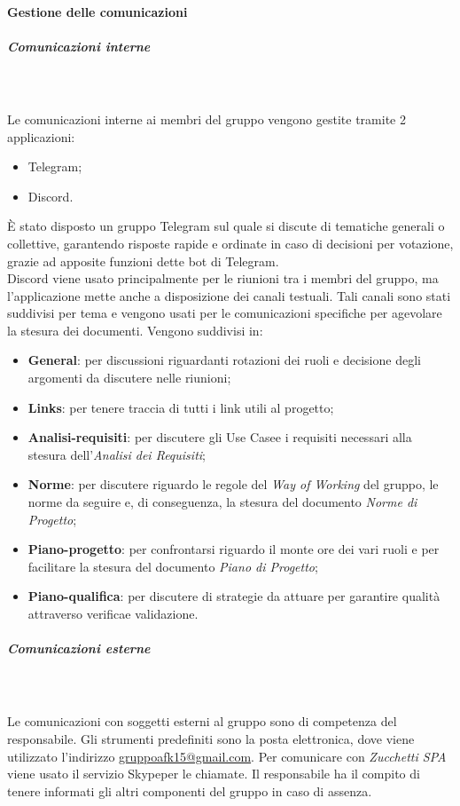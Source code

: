 \paragraph{Gestione delle comunicazioni}
\subparagraph{Comunicazioni interne}\mbox{} \\ \mbox{} \\
Le comunicazioni interne ai membri del gruppo vengono gestite  tramite 2 applicazioni:
\begin{itemize}
	\item Telegram\glo;
	\item Discord\glo.
\end{itemize}
È stato disposto un gruppo Telegram sul quale si discute di tematiche generali o collettive, garantendo risposte rapide e ordinate in caso di decisioni per votazione, grazie ad apposite funzioni dette bot di Telegram\glo. \\
Discord viene usato principalmente per le riunioni tra i membri del gruppo, ma l'applicazione mette anche a disposizione dei canali testuali. Tali canali sono stati suddivisi per tema e vengono usati per le comunicazioni specifiche per agevolare la stesura dei documenti. Vengono suddivisi in:
\begin{itemize}
	\item \textbf{General}: per discussioni riguardanti rotazioni dei ruoli e decisione degli argomenti da discutere nelle riunioni;
	\item \textbf{Links}: per tenere traccia di tutti i link utili al progetto;
	\item \textbf{Analisi-requisiti}: per discutere gli Use Case\glo e i requisiti necessari alla stesura dell'\textit{Analisi dei Requisiti};
	\item \textbf{Norme}: per discutere riguardo le regole del \textit{Way of Working} del gruppo, le norme da seguire e, di conseguenza, la stesura del documento \textit{Norme di Progetto}\glo;
	\item \textbf{Piano-progetto}: per confrontarsi riguardo il monte ore dei vari ruoli e per facilitare la stesura del documento \textit{Piano di Progetto};
	\item \textbf{Piano-qualifica}: per discutere di strategie da attuare per garantire qualità attraverso verifica\glo e validazione\glo.
\end{itemize}
\subparagraph{Comunicazioni esterne}\mbox{} \\ \mbox{} \\
Le comunicazioni con soggetti esterni al gruppo sono di competenza del responsabile. Gli strumenti predefiniti sono la posta elettronica, dove viene utilizzato l'indirizzo \href{mailto:gruppoafk15@gmail.com}{gruppoafk15@gmail.com}.
Per comunicare con \textit{Zucchetti SPA} viene usato il servizio Skype\glo per le chiamate. Il responsabile ha il compito di tenere informati gli altri componenti del gruppo in caso di assenza.


